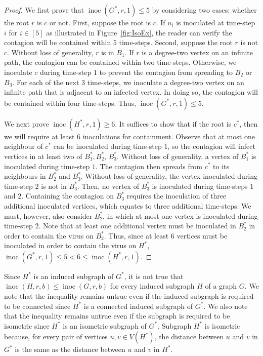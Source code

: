 \documentclass[unknownkeysallowed]{article}
\theoremstyle{definition}\newtheorem{strategy}{Strategy}
\theoremstyle{definition}\newtheorem{notation}{Notation}[theorem]
\DeclareMathOperator{\inoc}{inoc}
\begin{document}
\begin{proof} We first prove that $\inoc(G^*, r, 1)\leq 5$ by considering two cases: whether the root $r$ is $c$ or not.  First, suppose the root is $c$.   If $u_i$ is inoculated at time-step $i$ for $i\in [5]$ as illustrated in Figure~\ref{fig:IsoEx}, the reader can verify 
the contagion will be contained within $5$ time-steps. Second, suppose the root $r$ is not $c$.  Without loss of generality, $r$ is in $B_1$.   If $r$ is a degree-two vertex on an infinite path, the contagion can be contained within two time-steps.  Otherwise, we inoculate $c$ during time-step $1$ to prevent the contagion from spreading to $B_2$ or $B_3$.  For each of the next $3$ time-steps, we inoculate a degree-two vertex on an infinite path that is adjacent to an infected vertex. In doing so, the contagion will be contained within four time-steps.  Thus, $\inoc(G^*, r, 1) \leq 5$.  \medskip

We next prove $\inoc(H^*, r, 1) \geq 6$.  It suffices to show that if the root is $c^*$,  then we will require at least 6 inoculations for containment. Observe that at most one neighbour of $c^*$ can be inoculated during time-step $1$, so the contagion will infect vertices in at least two of $B_1^*,B_2^*$, $B_3^*$. Without loss of generality, a vertex of $B_1^*$ is inoculated during time-step $1$. The contagion then spreads from $c^*$ to its neighbours in $B_2^*$ and $B_3^*$.  Without loss of generality, the vertex inoculated during time-step $2$ is not in $B_3^*$. Then, no vertex of $B_3^*$ is inoculated during time-steps $1$ and $2$.  Containing the contagion on $B_3^*$ requires the inoculation of three additional inoculated vertices, which equates to three additional time-steps.  We must, however, also consider $B_2^*$, in which at most one vertex is inoculated during time-step $2$.  Note that at least one additional vertex must be inoculated in $B_2^*$ in order to contain the virus on $B_2^*$.  Thus, since at least 6 vertices must be inoculated in order to contain the virus on $H^*$, $\inoc(G^*, r, 1) \leq 5 < 6 \leq \inoc(H^*, r, 1)$.\end{proof}   

Since $H^*$ is an induced subgraph of $G^*$, it is not true that $\inoc(H, r, b) \leq \inoc(G, r, b)$ for every induced subgraph $H$ of a graph $G$.  We note that the inequality remains untrue even if the induced subgraph is required to be connected since $H^*$ is a connected induced subgraph of $G^*$.  We also note that the inequality remains untrue even if the subgraph is required to be isometric since $H^*$ is an isometric subgraph of $G^*$. Subgraph $H^*$ is isometric because, for every  pair of vertices $u,v \in V(H^*)$, the distance between $u$ and $v$ in $G^*$ is the same as the distance between $u$ and $v$ in $H^*$.
\end{document}
